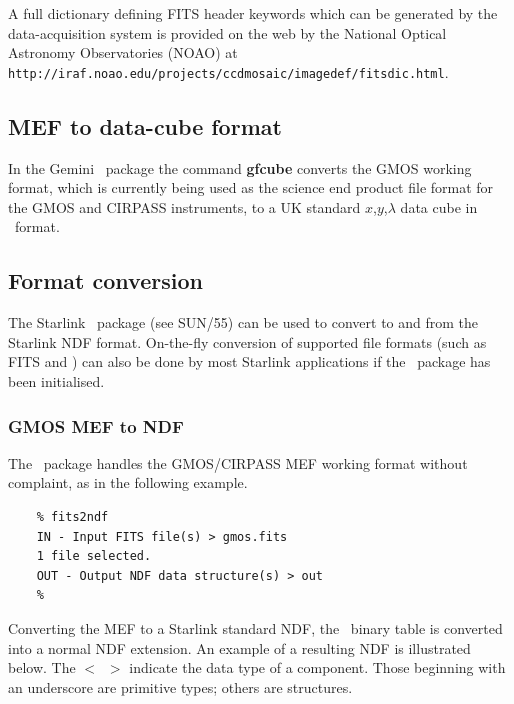 \documentclass[twoside,11pt]{article}
\newcommand{\htmladdnormallink}[2]{#1}
\newcommand{\xref}[3]{#1}
\newcommand{\xlabel}[1]{}
\newcommand{\latex}[1]{#1}
\begin{document}
A full
\htmladdnormallink{dictionary}{http://iraf.noao.edu/projects/ccdmosaic/imagedef/fitsdic.html}
defining FITS header keywords which can be generated by the
data-acquisition system is provided on the web by the National Optical
Astronomy Observatories (NOAO)\latex{ at {\tt
http://iraf.noao.edu/projects/ccdmosaic/imagedef/fitsdic.html}}.
 
\subsection{\xlabel{sc16_mef2cub}MEF to data-cube format\label{sc16_mef2cub}}

In the Gemini \IRAF\ package the command {\bf gfcube} converts the
GMOS working format, which is currently being used as the science end
product file format for the GMOS and CIRPASS instruments, to a UK
standard $x$,$y$,$\lambda$ data cube in \FITSref\ format.

\subsection{\xlabel{sc16_converting}Format conversion\label{sc16_converting}}

The Starlink \CONVERTref\ package \latex{(see SUN/55)} can be used
to convert to and from the Starlink \xref{NDF}{sun33}{} format.
On-the-fly conversion of supported file formats (such as FITS and
\IRAF) can also be done by most Starlink applications if the \CONVERT\
package has been initialised.

\subsubsection{GMOS MEF to NDF}

The \CONVERTref\ package handles the GMOS/CIRPASS MEF
working format without complaint, as in the following example.

\begin{verbatim}
    % fits2ndf
    IN - Input FITS file(s) > gmos.fits
    1 file selected.
    OUT - Output NDF data structure(s) > out
    %
\end{verbatim}

Converting the MEF to a Starlink standard \xref{NDF}{sun33}{}, the
\FITSref\ binary table is converted into a normal NDF extension.  An
example of a resulting NDF is illustrated below.  The $<$~$>$ indicate
the data type of a component.  Those beginning with an underscore are
primitive types; others are structures.
\end{document}
